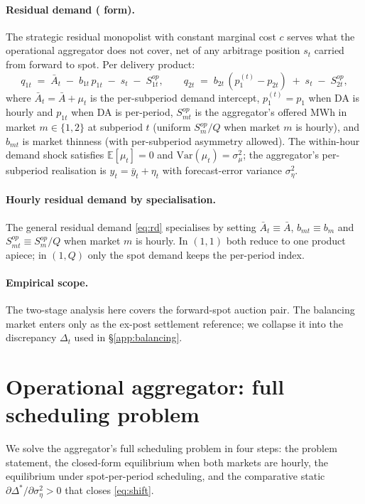 \documentclass[11pt]{article}
\begin{document}
\paragraph{Residual demand (\citet{ito_reguant_2016} form).} The strategic residual monopolist with constant marginal cost $c$ serves what the operational aggregator does not cover, net of any arbitrage position $s_t$ carried from forward to spot. Per delivery product:
\begin{equation}
q_{1t} \;=\; \bar A_t \;-\; b_{1t}\, p_{1t} \;-\; s_t \;-\; S^{op}_{1t},
\qquad
q_{2t} \;=\; b_{2t}\,(p_1^{(t)} - p_{2t}) \;+\; s_t \;-\; S^{op}_{2t},
\label{eq:rd}
\end{equation}
where $\bar A_t = \bar A + \mu_t$ is the per-subperiod demand intercept, $p_1^{(t)} = p_1$ when DA is hourly and $p_{1t}$ when DA is per-period, $S^{op}_{mt}$ is the aggregator's offered MWh in market $m \in \{1, 2\}$ at subperiod $t$ (uniform $S^{op}_m / Q$ when market $m$ is hourly), and $b_{mt}$ is market thinness (with per-subperiod asymmetry allowed). The within-hour demand shock satisfies $\mathbb{E}[\mu_t] = 0$ and $\mathrm{Var}(\mu_t) = \sigma_\mu^2$; the aggregator's per-subperiod realisation is $y_t = \bar y_t + \eta_t$ with forecast-error variance $\sigma_\eta^2$.

\paragraph{Hourly residual demand by specialisation.} The general residual demand \eqref{eq:rd} specialises by setting $\bar A_t \equiv \bar A$, $b_{mt} \equiv b_m$ and $S^{op}_{mt} \equiv S^{op}_m / Q$ when market $m$ is hourly. In $(1,1)$ both reduce to one product apiece; in $(1,Q)$ only the spot demand keeps the per-period index.

\paragraph{Empirical scope.} The two-stage analysis here covers the forward-spot auction pair. The balancing market enters only as the ex-post settlement reference; we collapse it into the discrepancy $\Delta_t$ used in \S\ref{app:balancing}.

\section{Operational aggregator: full scheduling problem}\label{app:aggregator}

We solve the aggregator's full scheduling problem in four steps: the problem statement, the closed-form equilibrium when both markets are hourly, the equilibrium under spot-per-period scheduling, and the comparative static $\partial \Delta^*/\partial \sigma_\eta^2 > 0$ that closes \eqref{eq:shift}.
\end{document}

